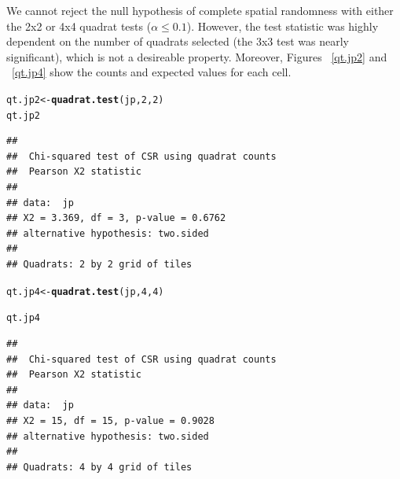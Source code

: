 \documentclass{article}\usepackage[]{graphicx}\usepackage[]{color}
\makeatletter
\newcommand{\hlnum}[1]{\textcolor[rgb]{0.686,0.059,0.569}{#1}}%
\newcommand{\hlstd}[1]{\textcolor[rgb]{0.345,0.345,0.345}{#1}}%
\newcommand{\hlkwb}[1]{\textcolor[rgb]{0.69,0.353,0.396}{#1}}%
\newcommand{\hlkwd}[1]{\textcolor[rgb]{0.737,0.353,0.396}{\textbf{#1}}}%
\newenvironment{kframe}{%
 \def\at@end@of@kframe{}%
 \ifinner\ifhmode%
  \def\at@end@of@kframe{\end{minipage}}%
  \begin{minipage}{\columnwidth}%
 \fi\fi%
 \def\FrameCommand##1{\hskip\@totalleftmargin \hskip-\fboxsep
 \colorbox{shadecolor}{##1}\hskip-\fboxsep
     \hskip-\linewidth \hskip-\@totalleftmargin \hskip\columnwidth}%
 \MakeFramed {\advance\hsize-\width
   \@totalleftmargin\z@ \linewidth\hsize
   \@setminipage}}%
 {\par\unskip\endMakeFramed%
 \at@end@of@kframe}
\newenvironment{knitrout}{}{} %
\makeatother
\begin{document}
We cannot reject the null hypothesis of complete spatial randomness with either the 2x2 or 4x4 quadrat tests ($\alpha \leq 0.1$).  However, the test statistic was highly dependent on the number of quadrats selected (the 3x3 test was nearly significant), which is not a desireable property. Moreover, Figures ~\ref{qt.jp2} and ~\ref{qt.jp4} show the counts and expected values for each cell.\\
\begin{knitrout}
\color{fgcolor}\begin{kframe}
\begin{alltt}
\hlstd{qt.jp2}\hlkwb{<-}\hlkwd{quadrat.test}\hlstd{(jp,}\hlnum{2}\hlstd{,}\hlnum{2}\hlstd{)}
\hlstd{qt.jp2}
\end{alltt}
\begin{verbatim}
## 
## 	Chi-squared test of CSR using quadrat counts
## 	Pearson X2 statistic
## 
## data:  jp
## X2 = 3.369, df = 3, p-value = 0.6762
## alternative hypothesis: two.sided
## 
## Quadrats: 2 by 2 grid of tiles
\end{verbatim}
\begin{alltt}
\hlstd{qt.jp4}\hlkwb{<-}\hlkwd{quadrat.test}\hlstd{(jp,}\hlnum{4}\hlstd{,}\hlnum{4}\hlstd{)}
\end{alltt}


{\ttfamily\noindent{}}\begin{alltt}
\hlstd{qt.jp4}
\end{alltt}
\begin{verbatim}
## 
## 	Chi-squared test of CSR using quadrat counts
## 	Pearson X2 statistic
## 
## data:  jp
## X2 = 15, df = 15, p-value = 0.9028
## alternative hypothesis: two.sided
## 
## Quadrats: 4 by 4 grid of tiles
\end{verbatim}
\end{kframe}
\end{knitrout}
\end{document}
